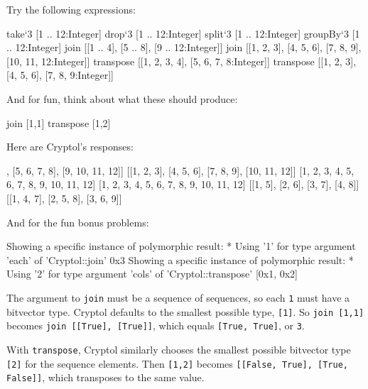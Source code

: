 \restartrepl
\begin{Exercise}\label{ex:seq:11}
Try the following expressions:\indTake\indDrop\indSplit\indGroup\indJoin\indTranspose
\begin{replinVerb}
  take`{3} [1 .. 12:Integer]
  drop`{3} [1 .. 12:Integer]
  split`{3} [1 .. 12:Integer]
  groupBy`{3} [1 .. 12:Integer]
  join [[1 .. 4], [5 .. 8], [9 .. 12:Integer]]
  join [[1, 2, 3], [4, 5, 6], [7, 8, 9], [10, 11, 12:Integer]]
  transpose [[1, 2, 3, 4], [5, 6, 7, 8:Integer]]
  transpose [[1, 2, 3], [4, 5, 6], [7, 8, 9:Integer]]
\end{replinVerb}
And for fun, think about what these should produce:
\begin{replinVerb}
  join [1,1]
  transpose [1,2]
\end{replinVerb}
\end{Exercise}
\begin{Answer}
Here are Cryptol's responses:
\begin{reploutVerb}
  [1, 2, 3]
  [4, 5, 6, 7, 8, 9, 10, 11, 12]
  [[1, 2, 3, 4], [5, 6, 7, 8], [9, 10, 11, 12]]
  [[1, 2, 3], [4, 5, 6], [7, 8, 9], [10, 11, 12]]
  [1, 2, 3, 4, 5, 6, 7, 8, 9, 10, 11, 12]
  [1, 2, 3, 4, 5, 6, 7, 8, 9, 10, 11, 12]
  [[1, 5], [2, 6], [3, 7], [4, 8]]
  [[1, 4, 7], [2, 5, 8], [3, 6, 9]]
\end{reploutVerb}
And for the fun bonus problems:
\begin{reploutVerb}
  Showing a specific instance of polymorphic result:
    * Using '1' for type argument 'each' of 'Cryptol::join'
  0x3
  Showing a specific instance of polymorphic result:
    * Using '2' for type argument 'cols' of 'Cryptol::transpose'
  [0x1, 0x2]
\end{reploutVerb}
The argument to \texttt{join} must be a sequence of sequences, so each
\texttt{1} must have a bitvector type. Cryptol defaults to the
smallest possible type, \texttt{[1]}. So \texttt{join [1,1]} becomes
\texttt{join [[True], [True]]}, which equals \texttt{[True, True]}, or
\texttt{3}.

With \texttt{transpose}, Cryptol similarly chooses the smallest
possible bitvector type \texttt{[2]} for the sequence elements. Then
\texttt{[1,2]} becomes \texttt{[[False, True], [True, False]]}, which
transposes to the same value.
\end{Answer}

